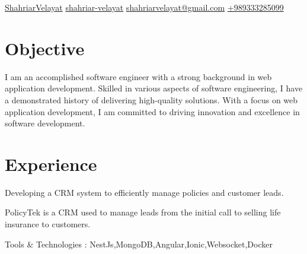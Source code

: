 \documentclass[]{plushcv}
\begin{document}
%
%
{\contactlines
{\href{https://www.github.com/ShahriarVelayat}{ShahriarVelayat}}
{\href{https://www.linkedin.com/in/shahriar-velayat/}{shahriar-velayat}}
{\href{shahriarvelayat@gmail.com}{shahriarvelayat@gmail.com}}
{\href{tel:+shahriarvelayat@gmail.com}{+989333285099}}}

%
%

\begin{minipage}[t]{0.70\textwidth} 


\section{Objective}

I am an accomplished software engineer with a strong background in web application development. Skilled in various aspects of software engineering, I have a demonstrated history of delivering high-quality solutions. With a focus on web application development, I am committed to driving innovation and excellence in software development.

\section{Experience}

\vspace{\topsep}
\begin{tightemize}
\sectionsep
\item Developing a CRM system to efficiently manage policies and customer leads.
\item PolicyTek is a CRM used to manage leads from the initial call to selling life insurance to customers.
\item  Tools \& Technologies : NestJs,MongoDB,Angular,Ionic,Websocket,Docker
\end{tightemize}
\sectionsep


\end{minipage}
\end{document}
